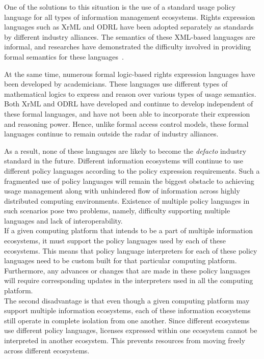 One of the solutions to this situation is the use of a standard usage policy language for all types of information management ecosystems. Rights expression languages such as XrML and ODRL have been adopted separately as standards by different industry alliances. The semantics of these XML-based languages are informal, and researches have demonstrated the difficulty involved in providing formal semantics for these languages~\cite{HaWe:08}. 

At the same time, numerous formal logic-based rights expression languages have been developed by academicians. These languages use different types of mathematical logics to express and reason over various types of usage semantics. Both XrML and ODRL have developed and continue to develop independent of these formal languages, and have not been able to incorporate their expression and reasoning power.  Hence, unlike formal access control models, these formal languages continue to remain outside the radar of industry alliances. 
 
As a result, none of these languages are likely to become the {\em defacto} industry standard in the future.  Different information ecosystems will continue to use different policy languages according to the policy expression requirements. Such a fragmented use of policy languages will remain the biggest obstacle to achieving usage management along with unhindered flow of information across highly distributed computing environments. Existence of multiple policy languages in such scenarios pose two problems, namely, difficulty supporting multiple languages and lack of interoperability. \\

If a given computing platform that intends to be a part of multiple information ecosystems, it must support the policy languages used by each of these ecosystems. This means that policy language interpreters for each of these policy languages need to be custom built for that particular computing platform. Furthermore, any advances or changes that are made in these policy languages will require corresponding updates in the interpreters used in all the computing platform.\\


The second disadvantage is that even though a given computing platform may support multiple information ecosystems, each of these information ecosystems still operate in complete isolation from one another.  Since different ecosystems use different policy languages, licenses expressed within one ecosystem cannot be interpreted in another ecosystem. This prevents resources from moving freely across different ecosystems. 

